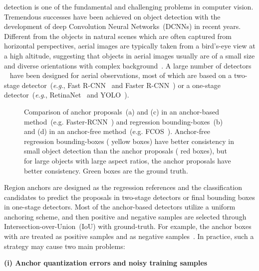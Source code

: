 \documentclass[journal]{IEEEtran}
\newcommand{\myparagraph}[1]{\vspace{0.1em}\noindent\textbf{#1}}
\newcommand{\eg}{\textit{e}.\textit{g}.}
\begin{document}
 detection is one of the fundamental and challenging problems in computer vision. Tremendous successes have been achieved on object detection with the development of deep Convolution Neural Networks~(DCNNs) in recent years. Different from the objects in natural scenes which are often captured from horizontal perspectives, aerial images are typically taken from a bird's-eye view at a high altitude, suggesting that objects in aerial images usually are of a small size and diverse orientations with complex background~\cite{xia2018dota}. A large number of detectors ~\cite{ding2019learning,yang2019scrdet,ming2020dynamic,yang2020dense} have been designed for aerial observations, most of which are based on a two-stage
detector~(\eg, Fast R-CNN~\cite{girshick2015fast} and Faster R-CNN~\cite{ren2016faster})
or a one-stage detector~(\eg, RetinaNet~\cite{lin2017focal} and YOLO~\cite{redmon2016you}).

\begin{figure}[t]
	\centering
	\caption{Comparison of anchor proposals~(a) and (c) in an anchor-based  method~(e.g. Faster-RCNN~\cite{ren2016faster}) and regression bounding-boxes~(b) and (d) in an anchor-free method~(e.g. FCOS~\cite{tian2019fcos}). Anchor-free regression bounding-boxes ({\color{yellow} yellow} boxes) have better consistency in small object detection than the anchor proposals ({\color{red} red} boxes), but for large objects with large aspect ratios, the anchor proposals have better consistency. {\color{green} Green} boxes are the ground truth.}
	\label{compare}
\end{figure}
Region anchors are designed as the regression references and the classification candidates to predict the proposals in two-stage detectors or final bounding boxes in one-stage detectors. Most of the anchor-based detectors utilize a uniform anchoring scheme, and then positive and negative samples are selected through Intersection-over-Union~(IoU) with ground-truth. For example, the anchor boxes with  are treated as positive samples and  as negative samples~\cite{ren2016faster}. In practice, such a strategy may cause two main problems:  

\myparagraph{(i) Anchor quantization errors and noisy training samples} 
\end{document}
